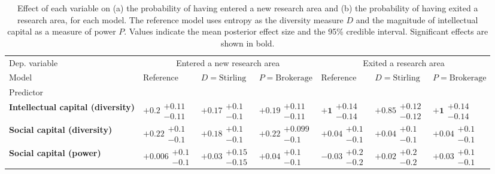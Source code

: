 \begin{table}[H]
\caption{Effect of each variable on (a) the probability of having entered a new research area and (b) the probability of having exited a research area, for each model. The reference model uses entropy as the diversity measure $D$ and the magnitude of intellectual capital as a measure of power $P$. Values indicate the mean posterior effect size and the 95\% credible interval. Significant effects are shown in bold.}
\label{table:summary_entered_exited}
\renewcommand{\arraystretch}{2}\fontsize{6}{7}\selectfont\begin{tabular}{lllllll}
\toprule
Dep. variable & \multicolumn{3}{c}{Entered a new research area} & \multicolumn{3}{c}{Exited a research area} \\
Model & Reference & $D=\text{Stirling}$ & $P=\text{Brokerage}$ & Reference & $D=\text{Stirling}$ & $P=\text{Brokerage}$ \\
Predictor &  &  &  &  &  &  \\
\midrule
\textbf{Intellectual capital (diversity)} & $\bm{+0.2}\substack{+0.11 \\ -0.11}$ & $\bm{+0.17}\substack{+0.1 \\ -0.1}$ & $\bm{+0.19}\substack{+0.11 \\ -0.11}$ & $\bm{+1}\substack{+0.14 \\ -0.14}$ & $\bm{+0.85}\substack{+0.12 \\ -0.12}$ & $\bm{+1}\substack{+0.14 \\ -0.14}$ \\
\textbf{Social capital (diversity)} & $\bm{+0.22}\substack{+0.1 \\ -0.1}$ & $\bm{+0.18}\substack{+0.1 \\ -0.1}$ & $\bm{+0.22}\substack{+0.099 \\ -0.1}$ & $+0.04\substack{+0.1 \\ -0.1}$ & $+0.04\substack{+0.1 \\ -0.1}$ & $+0.04\substack{+0.1 \\ -0.1}$ \\
\textbf{Social capital (power)} & $+0.006\substack{+0.1 \\ -0.1}$ & $+0.03\substack{+0.15 \\ -0.15}$ & $+0.04\substack{+0.1 \\ -0.1}$ & $-0.03\substack{+0.2 \\ -0.2}$ & $+0.02\substack{+0.2 \\ -0.2}$ & $+0.03\substack{+0.1 \\ -0.1}$ \\

\end{tabular}
\end{table}
